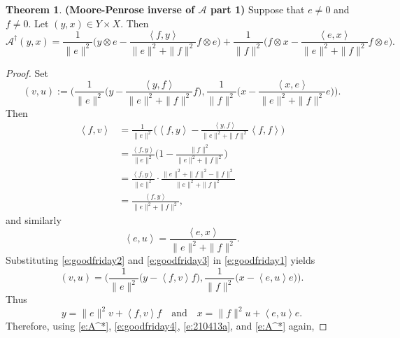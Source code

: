 \documentclass[12pt]{article}
\newcommand{\scal}[2]{\left\langle{#1},{#2}  \right\rangle}
\theoremstyle{definition}
\newtheorem{theorem}{Theorem}[section]
\providecommand{\mA}{\mathcal{A}}
\begin{document}
{\begin{theorem}\textbf{(Moore-Penrose inverse of $\mA$ part 1)}
\label{t:Adagger}
Suppose that $e\neq 0$ and $f\neq 0$. 
Let $(y,x)\in Y\times X$. 
Then 
\begin{equation}
\label{e:Adagger}
\mathcal{A}^\dagger(y,x)
= 
\frac{1}{\|e\|^2}\Big( y \otimes e - 
\frac{\scal{f}{{y}}}{\|e\|^2+\|f\|^2} f\otimes e\Big) + 
\frac{1}{\|f\|^2}\Big( f \otimes x - 
\frac{\scal{e}{x}}{\|e\|^2+\|f\|^2} f\otimes e\Big). 
\end{equation}
\end{theorem}
\begin{proof}
Set 
\begin{equation}
\label{e:goodfriday1}
(v,u) := 
\bigg(\frac{1}{\|e\|^2}\Big( y - 
\frac{\scal{y}{f}}{\|e\|^2 + \|f\|^2} f\Big), 
\frac{1}{\|f\|^2}\Big( x - 
\frac{\scal{x}{e}}{\|e\|^2 + \|f\|^2} e\Big)
\bigg). 
\end{equation}
Then 
\begin{subequations}
\label{e:goodfriday2}
\begin{align}
\scal{f}{v}
&= \frac{1}{\|e\|^2}
\Big(\scal{f}{y} - \frac{\scal{y}{f}}{\|e\|^2 + \|f\|^2}
\scal{f}{f}\Big)\\
&=\frac{\scal{f}{y}}{\|e\|^2}
\Big(
1- \frac{\|f\|^2}{\|e\|^2 + \|f\|^2}
\Big)\\
&=\frac{\scal{f}{y}}{\|e\|^2}
\cdot 
\frac{\|e\|^2 + \|f\|^2 - \|f\|^2}{\|e\|^2 + \|f\|^2}\\
&= \frac{\scal{f}{y}}{\|e\|^2 + \|f\|^2}, 
\end{align}
\end{subequations}
and similarly 
\begin{equation} 
\label{e:goodfriday3}
\scal{e}{u} = 
\frac{\scal{e}{x}}{\|e\|^2 + \|f\|^2}.
\end{equation}
Substituting \cref{e:goodfriday2} and \cref{e:goodfriday3}
in \cref{e:goodfriday1} yields 
\begin{equation}
\label{e:goodfriday4}
(v,u) = 
\Big(\frac{1}{\|e\|^2}\big( y - 
\scal{f}{{v}} f\big), 
\frac{1}{\|f\|^2}\big( x - 
\scal{e}{u} e\big)
\Big). 
\end{equation}
Thus 
\begin{equation}
\label{e:goodfriday5}
y = \|e\|^2v + \scal{f}{v}f
\quad\text{and}\quad
x = \|f\|^2u + \scal{e}{u}e.
\end{equation}
Therefore, using \cref{e:A^*}, \cref{e:goodfriday4}, 
\cref{e:210413a}, and \cref{e:A^*} again, 

\end{proof}}
\end{document}
